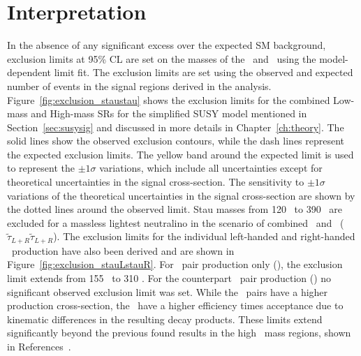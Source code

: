 	\section{Interpretation}
	\label{sec:interpretation}
	In the absence of any significant excess over the expected \ac{SM} background, exclusion limits at 95\% \ac{CL} are set on the masses of the \stau\ and \ninoone\ using the model-dependent limit fit.
	The exclusion limits are set using the observed and expected number of events in the signal regions derived in the analysis. 
	Figure~\ref{fig:exclusion_staustau} shows the exclusion limits for the combined Low-mass and High-mass \acp{SR} for the simplified \ac{SUSY} model mentioned in Section~\ref{sec:susysig} and discussed in more details in Chapter~\ref{ch:theory}.
	The solid lines show the observed exclusion contours, while the dash lines represent the expected exclusion limits. The yellow band around the expected limit is used to represent the $\pm1\sigma$ variations, which include all uncertainties except for theoretical uncertainties in the signal cross-section. 
	The sensitivity to $\pm1\sigma$ variations of the  theoretical uncertainties in the signal cross-section are shown by the dotted lines around the observed limit.
	Stau masses from 120 \gev\ to 390 \gev\ are excluded for a massless lightest neutralino in the scenario of combined \stauL\ and \stauR\ ($\tilde{\tau}_{L+R}\tilde{\tau}_{L+R}$). 
	The exclusion limits for the individual left-handed and right-handed \stau\ production have also been derived and are shown in Figure~\ref{fig:exclusion_stauLstauR}. 
	For \stauL\ pair production only (\stauL\stauL), the exclusion limit extends from 155 \gev\ to 310 \gev. 
	For the counterpart \stauR\  pair production  (\stauR\stauR) no significant observed exclusion limit was set. While the \stauL\ pairs have a higher production cross-section, the \stauR\ have a higher efficiency times acceptance due to kinematic differences in the resulting decay products. 
	These limits extend significantly beyond the previous found results in the high \stau\ mass regions, shown in References~\cite{ThreeLepPaper,Sirunyan_2020,sleptons_decaying_to_leptons,cms_stau}.
	
	\exclusionstaustau
	\exclusionstauLstauR
	
